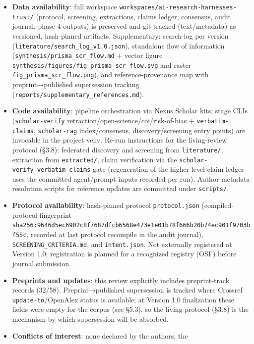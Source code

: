 \documentclass[11pt]{article}
\newcounter{none} %
\providecommand{\tightlist}{%
  \setlength{\itemsep}{0pt}\setlength{\parskip}{0pt}}
\begin{document}
\begin{itemize}
\tightlist
\item
  \textbf{Data availability}: full workspace
  \texttt{workspaces/ai-research-harnesses-trust/} (protocol, screening,
  extractions, claims ledger, consensus, audit journal, phase-4 outputs)
  is preserved and git-tracked (text/metadata) as versioned, hash-pinned
  artifacts. Supplementary: search-log per version
  (\texttt{literature/search\_log\_v1.0.json}), standalone flow of
  information (\texttt{synthesis/prisma\_scr\_flow.md} + vector figure
  \texttt{synthesis/figures/fig\_prisma\_scr\_flow.svg} and raster
  \texttt{fig\_prisma\_scr\_flow.png}), and reference-provenance map
  with preprint→published supersession tracking
  (\texttt{reports/supplementary\_references.md}).
\item
  \textbf{Code availability}: pipeline orchestration via Nexus Scholar
  kits; stage CLIs (\texttt{scholar-verify}
  retraction/open-science/coi/risk-of-bias + \texttt{verbatim-claims},
  \texttt{scholar-rag} index/consensus, discovery/screening entry
  points) are invocable in the project venv. Re-run instructions for the
  living-review protocol (§3.8): federated discovery and screening from
  \texttt{literature/}, extraction from \texttt{extracted/}, claim
  verification via the \texttt{scholar-verify\ verbatim-claims} gate
  (regeneration of the higher-level claim ledger uses the committed
  agent/prompt inputs recorded per run). Author-metadata resolution
  scripts for reference updates are committed under \texttt{scripts/}.
\item
  \textbf{Protocol availability}: hash-pinned protocol
  \texttt{protocol.json} (compiled-protocol fingerprint
  \texttt{sha256:9646d5ec6902c8f7687dfcb6568e473e1e01b78f666b20b74ec901f9703bf55c},
  recorded at last protocol recompile in the audit journal),
  \texttt{SCREENING\_CRITERIA.md}, and \texttt{intent.json}. Not
  externally registered at Version 1.0; registration is planned for a
  recognized registry (OSF) before journal submission.
\item
  \textbf{Preprints and updates}: this review explicitly includes
  preprint-track records (32/58). Preprint→published supersession is
  tracked where Crossref \texttt{update-to}/OpenAlex status is
  available; at Version 1.0 finalization these fields were empty for the
  corpus (see §5.3), so the living protocol (§3.8) is the mechanism by
  which supersession will be absorbed.
\item
  \textbf{Conflicts of interest}: none declared by the authors; the

\end{itemize}
\end{document}
